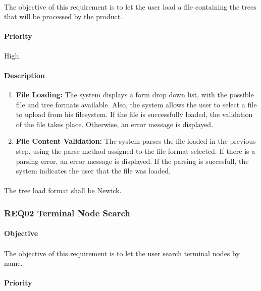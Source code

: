 \documentclass[10pt,a4paper]{article}
\begin{document}
\paragraph{}
The objective of this requirement is to let the user load a file containing the trees that will be processed by the product.
\paragraph{Priority}
High.
\paragraph{Description}

\begin{enumerate}
    \item \textbf{File Loading:}
	The system displays a form drop down list, with the possible file and tree formats available. Also, the system allows the user to select a file to upload from his filesystem. If the file is successfully loaded, the validation of the file takes place. Otherwise, an error message is displayed.
    
    \item \textbf{File Content Validation:}
	The system parses the file loaded in the previous step, using the parse method assigned to the file format selected. If there is a parsing error, an error message is displayed. If the parsing is succesfull, the system indicates the user that the file was loaded.
\end{enumerate}    

\paragraph{}
The tree load format shall be Newick.

 \subsubsection{REQ02 Terminal Node Search}
\paragraph{Objective}
\paragraph{}
The objective of this requirement is to let the user search terminal nodes by name.
\paragraph{Priority}
\end{document}
